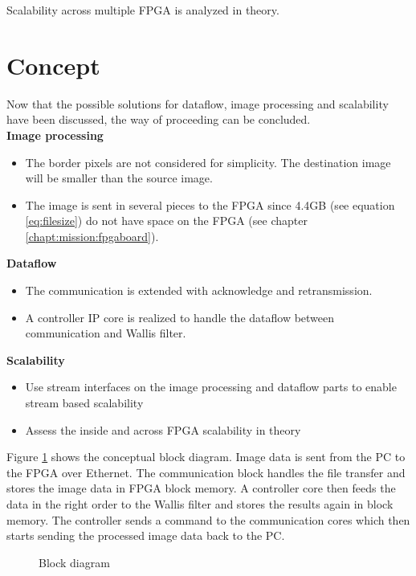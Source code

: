 Scalability across multiple FPGA is analyzed in theory.

%
%

\section{Concept} \label{chapt:mission:concept}
Now that the possible solutions for dataflow, image processing and scalability
have been discussed, the way of proceeding can be concluded.\\


\textbf{Image processing}
    \begin{itemize}
        \item The border pixels are not considered for simplicity. The destination image will be smaller than the source image.
        \item The image is sent in several pieces to the FPGA since 4.4GB 
        (see equation \ref{eq:filesize}) do not have space on the FPGA (see chapter \ref{chapt:mission:fpgaboard}).
    \end{itemize}

\textbf{Dataflow}
    \begin{itemize}
        \item The communication is extended with acknowledge and retransmission.
        \item A controller IP core is realized to handle the dataflow between
        communication and Wallis filter.
    \end{itemize}

\textbf{Scalability}
    \begin{itemize}
        \item Use stream interfaces on the image processing and dataflow parts
        to enable stream based scalability
        \item Assess the inside and across FPGA scalability in theory
    \end{itemize}


Figure \ref{fig:blockdiagram} shows the conceptual block diagram. Image data is
sent from the PC to the FPGA over Ethernet. The communication block handles the
file transfer and stores the image data in FPGA block memory. A controller core
then feeds the data in the right order to the Wallis filter and stores the
results again in block memory. The controller sends a command to the
communication cores which then starts sending the processed image data back to
the PC.

\begin{figure}[b!]
    \centering
    
    \caption{Block diagram}
    \label{fig:blockdiagram}
\end{figure}


